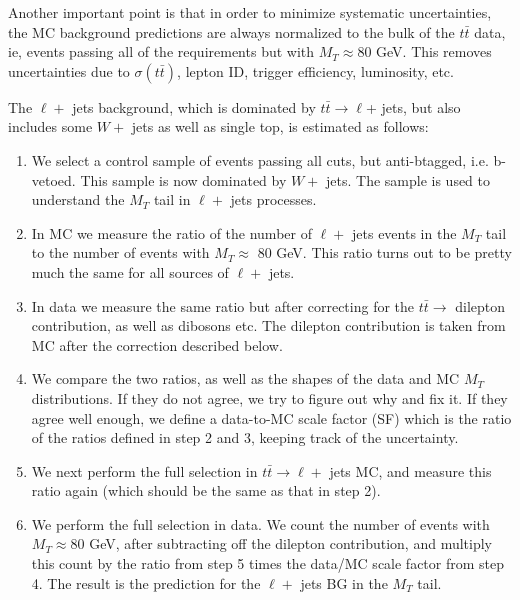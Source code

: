 Another important point is that in order to minimize systematic uncertainties, the MC background
predictions are always normalized to the bulk of the $t\bar{t}$ data, ie, events passing all of the 
requirements but with $M_T \approx 80$ GeV.
This removes uncertainties
due to $\sigma(t\bar{t})$, lepton ID, trigger efficiency, luminosity, etc.   

The $\ell +$ jets background, which is dominated by 
$t\bar{t} \to \ell $+ jets, but also includes some $W +$ jets as well as single top,
is estimated as follows:
\begin{enumerate}
\item We select a control sample of events passing all cuts, but anti-btagged, i.e. b-vetoed.  This
sample is now dominated by $W +$ jets.  The sample is used to understand the
$M_T$ tail in $\ell +$ jets processes. 
\item In MC we measure the ratio of the number of $\ell +$ jets events in the $M_T$ tail to
the number of events with $M_T \approx$ 80 GeV.  This ratio turns out to be pretty much the
same for all sources of $\ell +$ jets.
\item In data we measure the same ratio but after correcting for the $t\bar{t} \to$ dilepton
contribution, as well as dibosons etc.  The dilepton contribution is taken from MC after 
the correction described below.  
\item We compare the two ratios, as well as the shapes of the data and MC $M_T$ distributions. 
If they do not agree, we try to figure out why and fix it.  If they agree well enough, we define a 
data-to-MC scale factor (SF) which is the ratio of the  ratios defined in step 2 and 3, keeping track of the 
uncertainty.  
\item We next perform the full selection in $t\bar{t} \to \ell +$ jets MC, and measure this ratio
again (which should be the same as that in step 2).
\item 
We perform the full selection in data. We count the number of events with $M_T \approx 80$ GeV, after subtracting off the dilepton contribution,
  and multiply this count by the ratio from step 5 times the data/MC scale factor from step 4.
The result is the prediction for the $\ell +$ jets BG in the $M_T$ tail.
\end{enumerate}

